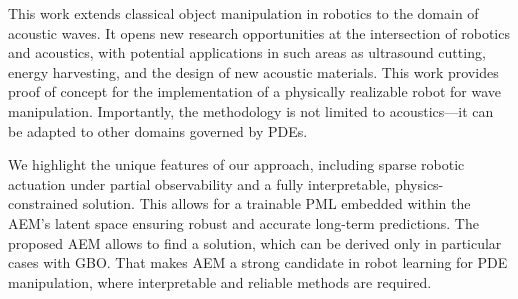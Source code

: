 



This work extends classical object manipulation in robotics to the domain of acoustic waves.
It opens new 
research opportunities at the intersection of robotics and acoustics, with potential applications in such areas as ultrasound cutting, energy harvesting, and the design of new acoustic materials. This work provides proof of concept for the implementation of a physically realizable robot for wave manipulation. Importantly, the methodology is not limited to acoustics—it can be adapted to other domains governed by PDEs.

We highlight the unique features of our approach, including sparse robotic actuation under partial observability and a fully interpretable, physics-constrained solution. This allows for a trainable PML embedded within the AEM’s latent space ensuring robust and accurate long-term predictions. The proposed AEM allows to find a solution, which can be derived only in particular cases with GBO. That makes AEM a strong candidate in robot learning for PDE manipulation, where interpretable and reliable methods are required.


